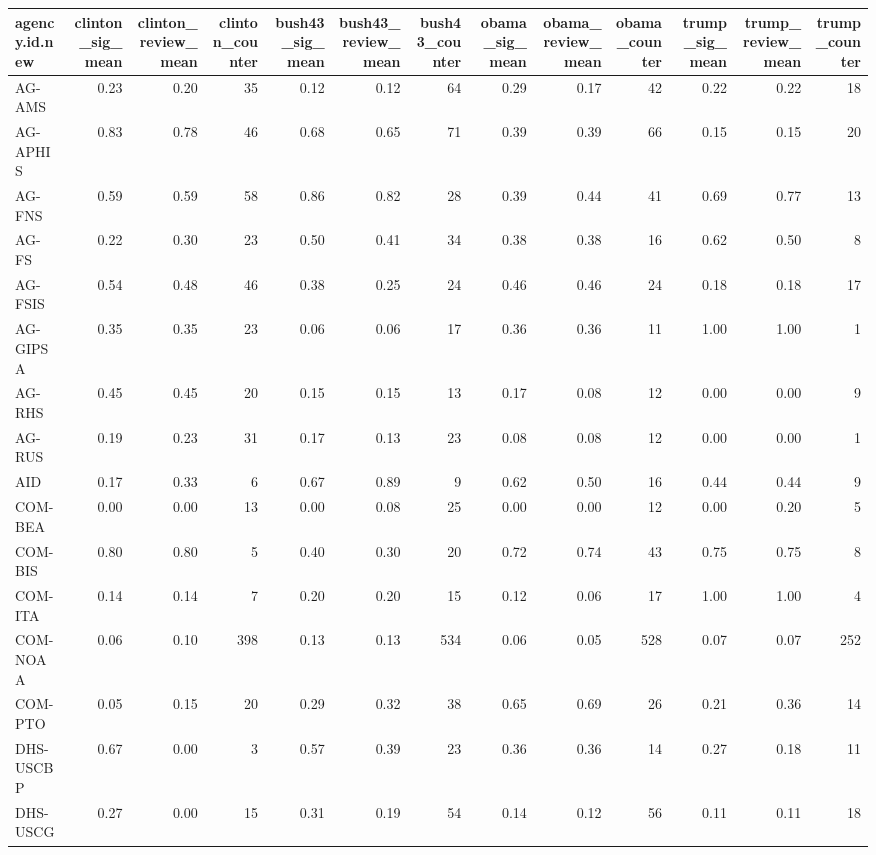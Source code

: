 \begin{table}[ht]
\centering
\begin{tabular}{lrrrrrrrrrrrr}
  \hline
agency.id.new & clinton\_sig\_mean & clinton\_review\_mean & clinton\_counter & bush43\_sig\_mean & bush43\_review\_mean & bush43\_counter & obama\_sig\_mean & obama\_review\_mean & obama\_counter & trump\_sig\_mean & trump\_review\_mean & trump\_counter \\ 
  \hline
AG-AMS & 0.23 & 0.20 &  35 & 0.12 & 0.12 &  64 & 0.29 & 0.17 &  42 & 0.22 & 0.22 &  18 \\ 
  AG-APHIS & 0.83 & 0.78 &  46 & 0.68 & 0.65 &  71 & 0.39 & 0.39 &  66 & 0.15 & 0.15 &  20 \\ 
  AG-FNS & 0.59 & 0.59 &  58 & 0.86 & 0.82 &  28 & 0.39 & 0.44 &  41 & 0.69 & 0.77 &  13 \\ 
  AG-FS & 0.22 & 0.30 &  23 & 0.50 & 0.41 &  34 & 0.38 & 0.38 &  16 & 0.62 & 0.50 &   8 \\ 
  AG-FSIS & 0.54 & 0.48 &  46 & 0.38 & 0.25 &  24 & 0.46 & 0.46 &  24 & 0.18 & 0.18 &  17 \\ 
  AG-GIPSA & 0.35 & 0.35 &  23 & 0.06 & 0.06 &  17 & 0.36 & 0.36 &  11 & 1.00 & 1.00 &   1 \\ 
  AG-RHS & 0.45 & 0.45 &  20 & 0.15 & 0.15 &  13 & 0.17 & 0.08 &  12 & 0.00 & 0.00 &   9 \\ 
  AG-RUS & 0.19 & 0.23 &  31 & 0.17 & 0.13 &  23 & 0.08 & 0.08 &  12 & 0.00 & 0.00 &   1 \\ 
  AID & 0.17 & 0.33 &   6 & 0.67 & 0.89 &   9 & 0.62 & 0.50 &  16 & 0.44 & 0.44 &   9 \\ 
  COM-BEA & 0.00 & 0.00 &  13 & 0.00 & 0.08 &  25 & 0.00 & 0.00 &  12 & 0.00 & 0.20 &   5 \\ 
  COM-BIS & 0.80 & 0.80 &   5 & 0.40 & 0.30 &  20 & 0.72 & 0.74 &  43 & 0.75 & 0.75 &   8 \\ 
  COM-ITA & 0.14 & 0.14 &   7 & 0.20 & 0.20 &  15 & 0.12 & 0.06 &  17 & 1.00 & 1.00 &   4 \\ 
  COM-NOAA & 0.06 & 0.10 & 398 & 0.13 & 0.13 & 534 & 0.06 & 0.05 & 528 & 0.07 & 0.07 & 252 \\ 
  COM-PTO & 0.05 & 0.15 &  20 & 0.29 & 0.32 &  38 & 0.65 & 0.69 &  26 & 0.21 & 0.36 &  14 \\ 
  DHS-USCBP & 0.67 & 0.00 &   3 & 0.57 & 0.39 &  23 & 0.36 & 0.36 &  14 & 0.27 & 0.18 &  11 \\ 
  DHS-USCG & 0.27 & 0.00 &  15 & 0.31 & 0.19 &  54 & 0.14 & 0.12 &  56 & 0.11 & 0.11 &  18 \\ 

\end{tabular}
\end{table}
